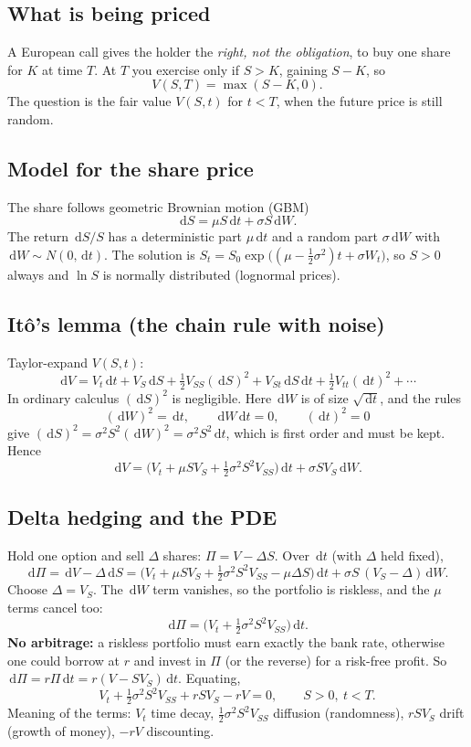 \documentclass[11pt]{article}
\newcommand{\dd}{\,\mathrm d}
\theoremstyle{definition}
\begin{document}
\subsection{What is being priced}
A European call gives the holder the \emph{right, not the obligation}, to buy one share for $K$ at time $T$.
At $T$ you exercise only if $S>K$, gaining $S-K$, so
\[
  V(S,T)=\max(S-K,0).
\]
The question is the fair value $V(S,t)$ for $t<T$, when the future price is still random.

\subsection{Model for the share price}
The share follows geometric Brownian motion (GBM)
\[
  \dd S=\mu S\dd t+\sigma S\dd W .
\]
The return $\dd S/S$ has a deterministic part $\mu\dd t$ and a random part $\sigma\dd W$ with
$\dd W\sim N(0,\dd t)$. The solution is $S_t=S_0\exp\big((\mu-\tfrac12\sigma^2)t+\sigma W_t\big)$, so
$S>0$ always and $\ln S$ is normally distributed (lognormal prices).

\subsection{Itô's lemma (the chain rule with noise)}
Taylor-expand $V(S,t)$:
\[
  \dd V=V_t\dd t+V_S\dd S+\tfrac12V_{SS}(\dd S)^2+V_{St}\dd S\dd t+\tfrac12V_{tt}(\dd t)^2+\cdots
\]
In ordinary calculus $(\dd S)^2$ is negligible. Here $\dd W$ is of size $\sqrt{\dd t}$, and the rules
\[
  (\dd W)^2=\dd t,\qquad \dd W\dd t=0,\qquad (\dd t)^2=0
\]
give $(\dd S)^2=\sigma^2S^2(\dd W)^2=\sigma^2S^2\dd t$, which is first order and must be kept. Hence
\[
  \dd V=\Big(V_t+\mu SV_S+\tfrac12\sigma^2S^2V_{SS}\Big)\dd t+\sigma SV_S\dd W. \tag{1}
\]

\subsection{Delta hedging and the PDE}
Hold one option and sell $\Delta$ shares: $\Pi=V-\Delta S$. Over $\dd t$ (with $\Delta$ held fixed),
\[
  \dd\Pi=\dd V-\Delta\dd S
  =\Big(V_t+\mu SV_S+\tfrac12\sigma^2S^2V_{SS}-\mu\Delta S\Big)\dd t+\sigma S\,(V_S-\Delta)\dd W .
\]
Choose $\Delta=V_S$. The $\dd W$ term vanishes, so the portfolio is riskless, and the $\mu$ terms cancel too:
\[
  \dd\Pi=\Big(V_t+\tfrac12\sigma^2S^2V_{SS}\Big)\dd t .
\]
\textbf{No arbitrage:} a riskless portfolio must earn exactly the bank rate, otherwise one could borrow at
$r$ and invest in $\Pi$ (or the reverse) for a risk-free profit. So
$\dd\Pi=r\Pi\dd t=r(V-SV_S)\dd t$. Equating,
\[
  \boxed{\;V_t+\tfrac12\sigma^2S^2V_{SS}+rSV_S-rV=0,\qquad S>0,\ t<T.\;} \tag{BS}
\]
Meaning of the terms: $V_t$ time decay, $\frac12\sigma^2S^2V_{SS}$ diffusion (randomness),
$rSV_S$ drift (growth of money), $-rV$ discounting.
\end{document}

